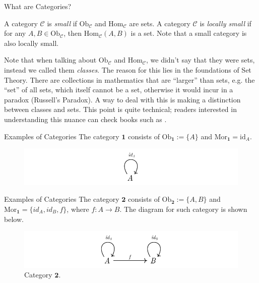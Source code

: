 \documentclass[aspectratio=169,xcolor=dvipsnames,10pt]{beamer}
\begin{document}
\begin{frame}[fragile]{What are Categories?}

    \begin{definition}
        A category $\mathcal C$ is \textit{small} if $\text{Ob}_\mathcal C$ and
        $\text{Hom}_\mathcal C$ are sets. A category $\mathcal C$ is \textit{locally small} if
        for any $A, B \in \text{Ob}_\mathcal C$, then
        $\text{Hom}_\mathcal C(A,B)$ is a set. Note that a small category is also locally small.
    \end{definition}

    Note that when talking about $\text{Ob}_\mathcal C$ and $\text{Hom}_\mathcal C$, we didn't say
    that they were sets, instead we called them \textit{classes}. The reason for
    this lies in the foundations of Set Theory. There are collections in mathematics
    that are ``larger'' than sets, e.g. the ``set'' of all sets, which itself cannot be a set,
    otherwise it would incur in a paradox (Russell's Paradox). A way to deal
    with this is making a distinction between classes and sets.
    This point is quite technical; readers interested in understanding this nuance can check books such as \citet{borceux1994handbook}.
\end{frame}

\begin{frame}[fragile]{Examples of Categories}
    The category $\mathbf{1}$ consists of $\text{Ob}_{\mathbf{1}} := \{A\}$ and $\mathrm{Mor}_{\mathbf{1}} = \mathrm{id}_A$.

	\begin{figure}[H]
		\begin{center}
			\includegraphics[width=1.0\textwidth]{./figs/1Cat.pdf}
		\end{center}
	\end{figure}

\end{frame}

\begin{frame}[fragile]{Examples of Categories}
	The category $\bm 2$ consists of $\text{Ob}_{\bm 2} := \{A, B\}$ and $\text{Mor}_{\bm 1} = \{id_A, id_B, f\}$,
	where $f:A \to B$.
	The diagram for such category is shown below.
	\begin{figure}[H]
		\begin{center}
			\includegraphics[width=1.00\textwidth]{./figs/2Cat.pdf}
		\end{center}
		\caption{Category $\bm 2$.}
		\label{fig:2Cat}
	\end{figure}
\end{frame}
\end{document}
